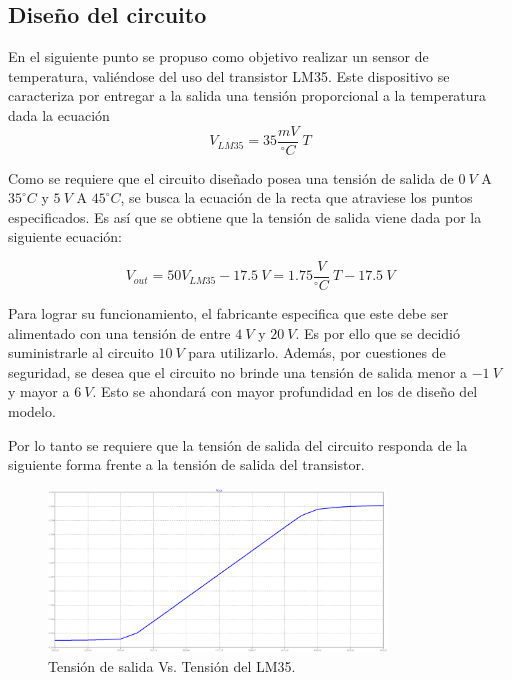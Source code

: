 \documentclass[a4paper]{article}
\begin{document}
\subsection{Diseño del circuito}

En el siguiente punto se propuso como objetivo realizar un sensor de temperatura, valiéndose del uso del transistor LM35. Este dispositivo se caracteriza por entregar a la salida una tensión proporcional a la temperatura dada la ecuación
\[
	V_{LM35} = 35 \frac{mV}{^{\circ}C} \ T
\]

Como se requiere que el circuito diseñado posea una tensión de salida de $ 0 \ V $ A $ 35 ^{\circ}C $ y $ 5 \ V $ A $ 45 ^{\circ}C $, se busca la ecuación de la recta que atraviese los puntos especificados. Es así que se obtiene que la tensión de salida viene dada por la siguiente ecuación:

\begin{equation}
	V_{out} = 50V_{LM35} - 17.5 \ V =  1.75 \frac{V}{^{\circ}C} \ T - 17.5 \ V
	\label{equ:sistema}
\end{equation}

Para lograr su funcionamiento, el fabricante especifica que este debe ser alimentado con una tensión de entre $4 \ V$ y $20 \ V$. Es por ello que se decidió suministrarle al circuito $10 \ V$ para utilizarlo.
Además, por cuestiones de seguridad, se desea que el circuito no brinde una tensión de salida menor a $-1 \ V$ y mayor a $6 \ V$. Esto se ahondará con mayor profundidad en los de diseño del modelo.

Por lo tanto se requiere que la tensión de salida del circuito responda de la siguiente forma frente a la tensión de salida del transistor.

\begin{figure}[H]
	\centering
	\includegraphics[width=0.8\textwidth]{Ejercicio6/Imagenes/SalidaVsVLM35.png}
\caption{Tensión de salida Vs. Tensión del LM35.}
	\label{fig:vout}
\end{figure}
\end{document}
